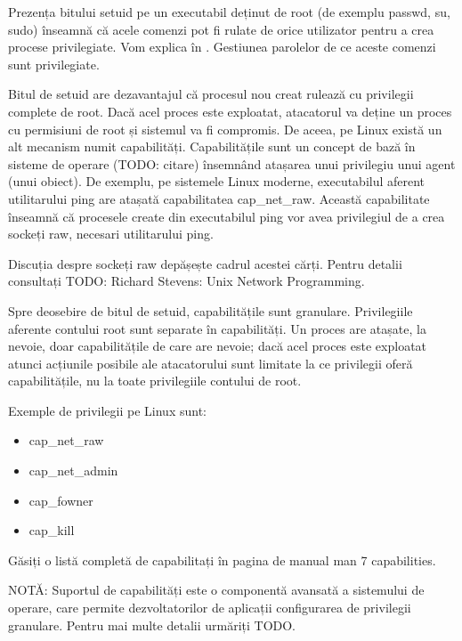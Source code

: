 Prezența bitului setuid pe un executabil deținut de root (de exemplu passwd, su,
sudo) înseamnă că acele comenzi pot fi rulate de orice utilizator pentru a crea
procese privilegiate. Vom explica în .
Gestiunea parolelor de ce aceste comenzi sunt privilegiate.

Bitul de setuid are dezavantajul că procesul nou creat rulează cu privilegii
complete de root. Dacă acel proces este exploatat, atacatorul va deține un
proces cu permisiuni de root și sistemul va fi compromis. De aceea, pe Linux
există un alt mecanism numit capabilități. Capabilitățile sunt un concept de
bază în sisteme de operare (TODO: citare) însemnând atașarea unui privilegiu
unui agent (unui obiect). De exemplu, pe sistemele Linux moderne, executabilul
aferent utilitarului ping are atașată capabilitatea cap_net_raw. Această
capabilitate înseamnă că procesele create din executabilul ping vor avea
privilegiul de a crea sockeți raw, necesari utilitarului ping.

\begin{note}[NOTĂ]

Discuția despre sockeți raw depășește cadrul acestei cărți. Pentru detalii
consultați TODO: Richard Stevens: Unix Network Programming.

\end{note}

Spre deosebire de bitul de setuid, capabilitățile sunt granulare. Privilegiile
aferente contului root sunt separate în capabilități. Un proces are atașate, la
nevoie, doar capabilitățile de care are nevoie; dacă acel proces este exploatat
atunci acțiunile posibile ale atacatorului sunt limitate la ce privilegii oferă
capabilitățile, nu la toate privilegiile contului de root.

Exemple de privilegii pe Linux sunt:

\begin{itemize}
	\item cap_net_raw
	\item cap_net_admin
	\item cap_fowner
	\item cap_kill
\end{itemize}

Găsiți o listă completă de capabilitați în pagina de manual man 7 capabilities.

NOTĂ: Suportul de capabilități este o componentă avansată a sistemului de
operare, care permite dezvoltatorilor de aplicații configurarea de privilegii
granulare. Pentru mai multe detalii urmăriți TODO.

